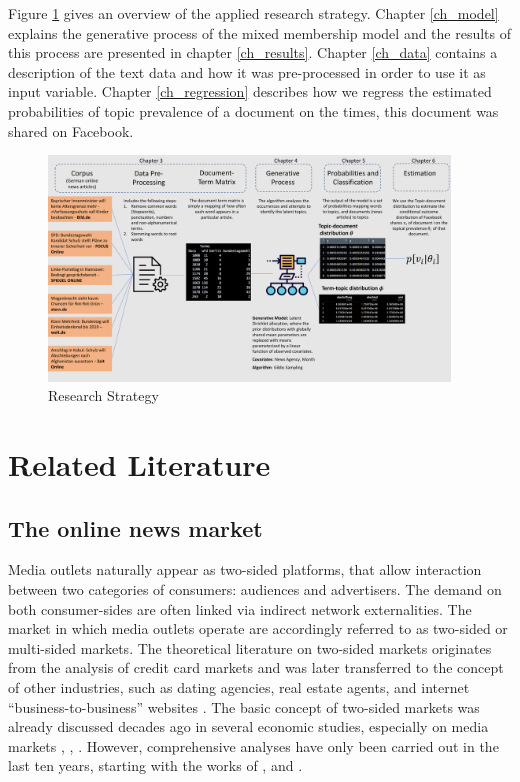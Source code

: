 \documentclass[12pt,a4paper,notitlepage]{article}
\begin{document}
Figure \ref{fig_research_strat} gives an overview of the applied research strategy. Chapter \ref{ch_model} explains the generative process of the mixed membership model and the results of this process are presented in chapter \ref{ch_results}. Chapter \ref{ch_data} contains a description of the text data and how it was pre-processed in order to use it as input variable.  Chapter \ref{ch_regression} describes how we regress the estimated probabilities of topic prevalence of a document on the times, this document was shared on Facebook.

\begin{figure}[ht]
	\centering
	\includegraphics[width=0.95\textwidth]{../figs/research_strategy.pdf} 
	\caption{Research Strategy}
	\label{fig_research_strat}
\end{figure}

\section{Related Literature}
\subsection{The online news market}

Media outlets naturally appear as two-sided platforms, that allow interaction between two categories of consumers: audiences and advertisers. The demand on both consumer-sides are often linked via indirect network externalities. The market in which media outlets operate are accordingly referred to as two-sided or multi-sided markets. The theoretical literature on two-sided markets originates from the analysis of credit card markets \citep{rochet_platform_2003} and was later transferred to the concept of other industries, such as dating agencies, real estate agents, and internet “business-to-business” websites \citep{caillaud_chicken_2003}. The basic concept of two-sided markets was already discussed decades ago in several economic studies, especially on media markets \citep{corden_maximisation_1952}, \citep{gustafsson_circulation_1978}, \citep{blair_pricing_1993}. However, comprehensive analyses have only been carried out in the last ten years, starting with the works of \citet{rochet_platform_2003}, \citet{evans_empirical_2003} and \citet{armstrong_competition_2006}.
\end{document}
